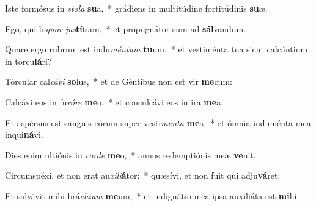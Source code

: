 \item Iste formósus in \textit{sto}\textit{la} \textbf{su}a,~* grádiens in multitúdine fortitúdinis \textbf{su}æ.
\item Ego, qui lo\textit{quor} \textit{jus}\textbf{tí}tiam,~* et propugnátor sum ad \textbf{sál}vandum.
\item Quare ergo rubrum est indu\textit{mén}\textit{tum} \textbf{tu}um,~* et vestiménta tua sicut calcántium in torcu\textbf{lá}ri?
\item Tórcular cal\textit{cá}\textit{vi} \textbf{so}lus,~* et de Géntibus non est vir \textbf{me}cum:
\item Calcávi eos in fu\textit{ró}\textit{re} \textbf{me}o,~* et conculcávi eos in ira \textbf{me}a:
\item Et aspérsus est sanguis eórum super vesti\textit{mén}\textit{ta} \textbf{me}a,~* et ómnia induménta mea inqui\textbf{ná}vi.
\item Dies enim ultiónis in \textit{cor}\textit{de} \textbf{me}o,~* annus redemptiónis meæ \textbf{ve}nit.
\item Circumspéxi, et non erat au\textit{xi}\textit{li}\textbf{á}tor:~* quæsívi, et non fuit qui adju\textbf{vá}ret:
\item Et salvávit mihi brá\textit{chi}\textit{um} \textbf{me}um,~* et indignátio mea ipsa auxiliáta est \textbf{mi}hi.

